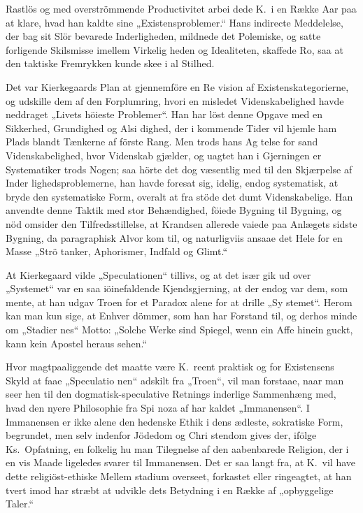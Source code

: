 \documentclass[12pt,a4paper]{article}
\newcommand{\opage}[1]{\marginnote{\footnotesize\textit{[#1]}}}
\begin{document}
Rastlös og med overströmmende Productivitet arbei\-%
dede K.\ i en Række Aar paa at klare, hvad han kaldte
sine „Existensproblemer.“ Hans indirecte Meddelelse,
der bag sit Slör bevarede Inderligheden, mildnede det
Polemiske, og satte forligende Skilsmisse imellem Virkelig\-%
heden og Idealiteten, skaffede Ro, saa at den taktiske
Fremrykken kunde skee i al Stilhed.

Det var Kierkegaards Plan at gjennemföre en Re\-%
vision af Existenskategorierne, og udskille dem af den
Forplumring, hvori en misledet Videnskabelighed havde
neddraget „Livets höieste Problemer“. Han har löst
denne Opgave med en Sikkerhed, Grundighed og Alsi\-%
dighed, der i kommende Tider vil hjemle ham Plads
blandt Tænkerne af förste Rang. Men trods hans Ag\-%
telse for sand Videnskabelighed, hvor Videnskab gjælder,
og uagtet han i Gjerningen er Systematiker trods Nogen;
saa hörte det dog væsentlig med til den Skjærpelse af Inder\-%
lighedsproblemerne, han havde foresat sig, idelig, endog
systematisk, at bryde den systematiske Form, overalt at fra\-%
stöde det dumt Videnskabelige. Han anvendte denne Taktik
med stor Behændighed, föiede Bygning til Bygning, og nöd
omsider den Tilfredsstillelse, at Krandsen allerede vaiede
paa Anlægets sidste Bygning, da paragraphisk Alvor kom
til, og naturligviis ansaae det Hele for en Masse „Strö\-%
tanker, Aphorismer, Indfald og Glimt.“

At Kierkegaard vilde „Speculationen“ tillivs, og at
det især gik ud over „Systemet“ var en saa iöinefaldende
Kjendsgjerning, at der endog var dem, som mente, at
\opage{9} %
han udgav Troen for et Paradox alene for at drille „Sy\-%
stemet“. Herom kan man kun sige, at Enhver dömmer,
som han har Forstand til, og derhos minde om „Stadier\-%
nes“ Motto: „Solche Werke sind Spiegel, wenn ein Affe
hinein guckt, kann kein Apostel heraus sehen.“

Hvor magtpaaliggende det maatte være K.\ reent
praktisk og for Existensens Skyld at faae „Speculatio\-%
nen“ adskilt fra „Troen“, vil man forstaae, naar man
seer hen til den dogmatisk-speculative Retnings inderlige
Sammenhæng med, hvad den nyere Philosophie fra Spi\-%
noza af har kaldet „Immanensen“. I Immanensen er
ikke alene den hedenske Ethik i dens ædleste, sokratiske
Form, begrundet, men selv indenfor Jödedom og Chri\-%
stendom gives der, ifölge Ks.\ Opfatning, en folkelig hu\-%
man Tilegnelse af den aabenbarede Religion, der i en
vis Maade ligeledes svarer til Immanensen. Det er saa
langt fra, at K.\ vil have dette religiöst-ethiske Mellem\-%
stadium overseet, forkastet eller ringeagtet, at han tvert\-%
imod har stræbt at udvikle dets Betydning i en Række
af „opbyggelige Taler.“
\end{document}
